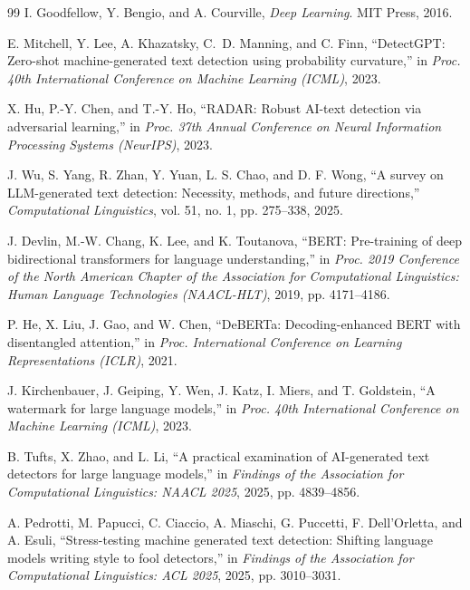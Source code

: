 \documentclass[conference]{IEEEtran}
\begin{document}
\begin{thebibliography}{99}
I. Goodfellow, Y. Bengio, and A. Courville,
\textit{Deep Learning}.
MIT Press, 2016.



E. Mitchell, Y. Lee, A. Khazatsky, C.~D. Manning, and C. Finn,
``DetectGPT: Zero-shot machine-generated text detection using probability
curvature,''
in \textit{Proc. 40th International Conference on Machine Learning (ICML)},
2023.



X. Hu, P.-Y. Chen, and T.-Y. Ho,
``RADAR: Robust AI-text detection via adversarial learning,''
in \textit{Proc. 37th Annual Conference on Neural Information Processing
Systems (NeurIPS)}, 2023.



J. Wu, S. Yang, R. Zhan, Y. Yuan, L. S. Chao, and D. F. Wong,
``A survey on LLM-generated text detection: Necessity, methods, and future
directions,''
\textit{Computational Linguistics}, vol. 51, no. 1, pp. 275--338, 2025.



J. Devlin, M.-W. Chang, K. Lee, and K. Toutanova,
``BERT: Pre-training of deep bidirectional transformers for language
understanding,''
in \textit{Proc. 2019 Conference of the North American Chapter of the
Association for Computational Linguistics: Human Language Technologies
(NAACL-HLT)}, 2019, pp. 4171--4186.



P. He, X. Liu, J. Gao, and W. Chen,
``DeBERTa: Decoding-enhanced BERT with disentangled attention,''
in \textit{Proc. International Conference on Learning Representations
(ICLR)}, 2021.



J. Kirchenbauer, J. Geiping, Y. Wen, J. Katz, I. Miers, and T. Goldstein,
``A watermark for large language models,''
in \textit{Proc. 40th International Conference on Machine Learning (ICML)},
2023.



B. Tufts, X. Zhao, and L. Li,
``A practical examination of AI-generated text detectors for large language
models,''
in \textit{Findings of the Association for Computational Linguistics:
NAACL 2025}, 2025, pp. 4839--4856.



A. Pedrotti, M. Papucci, C. Ciaccio, A. Miaschi, G. Puccetti,
F. Dell'Orletta, and A. Esuli,
``Stress-testing machine generated text detection: Shifting language models
writing style to fool detectors,''
in \textit{Findings of the Association for Computational Linguistics:
ACL 2025}, 2025, pp. 3010--3031.




\end{thebibliography}
\end{document}
